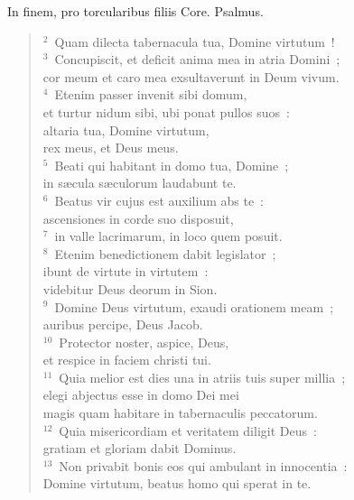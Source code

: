 \lettrine[lines=3,image=true,loversize=0.05,lraise=-0.03]{I}{}n finem, pro torcularibus filiis Core. Psalmus.
\begin{flushleft}\begin{verse}\vspace{6pt}${}^{2}$~Quam dilecta tabernacula tua, Domine virtutum~!\\
${}^{3}$~Concupiscit, et deficit anima mea in atria Domini~;\\ cor meum et caro mea exsultaverunt in Deum vivum.\\
${}^{4}$~Etenim passer invenit sibi domum,\\ et turtur nidum sibi, ubi ponat pullos suos~:\\ altaria tua, Domine virtutum,\\ rex meus, et Deus meus.\\
${}^{5}$~Beati qui habitant in domo tua, Domine~;\\ in s\ae cula s\ae culorum laudabunt te.\\
${}^{6}$~Beatus vir cujus est auxilium abs te~:\\ ascensiones in corde suo disposuit,\\
${}^{7}$~in valle lacrimarum, in loco quem posuit.\\
${}^{8}$~Etenim benedictionem dabit legislator~;\\ ibunt de virtute in virtutem~:\\ videbitur Deus deorum in Sion.\\
${}^{9}$~Domine Deus virtutum, exaudi orationem meam~;\\ auribus percipe, Deus Jacob.\\
${}^{10}$~Protector noster, aspice, Deus,\\ et respice in faciem christi tui.\\
${}^{11}$~Quia melior est dies una in atriis tuis super millia~;\\ elegi abjectus esse in domo Dei mei\\ magis quam habitare in tabernaculis peccatorum.\\
${}^{12}$~Quia misericordiam et veritatem diligit Deus~:\\ gratiam et gloriam dabit Dominus.\\
${}^{13}$~Non privabit bonis eos qui ambulant in innocentia~:\\ Domine virtutum, beatus homo qui sperat in te.\end{verse}\end{flushleft}




